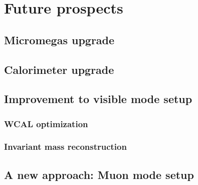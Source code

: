 
\chapter{Future prospects} %
\label{chapter5} %


\section{Micromegas upgrade}
\label{chapter5:sec:mm-upgrades}

\section{Calorimeter upgrade}
\label{chapter5:sec:cal-upgrades}

\section{Improvement to visible mode setup}
\label{chapter5:sec:new-vismode-setup}

\subsection{WCAL optimization}
\label{chapter5:sec:new-vismode-setup-wcal}

\subsection{Invariant mass reconstruction}
\label{chapter5:sec:new-vismode-setup-invmass}

\section{A new approach: Muon mode setup}
\label{chapter5:sec:muon-mode-setup}
